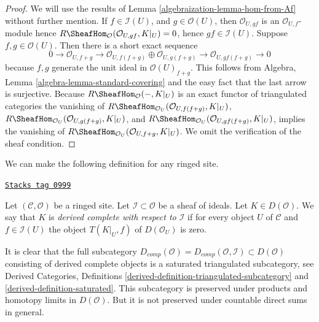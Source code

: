 \begin{proof}

We will use the results of Lemma \ref{algebraization-lemma-hom-from-Af} without further
mention. If $f \in \mathcal{I}(U)$, and $g \in \mathcal{O}(U)$, then
$\mathcal{O}_{U, gf}$ is an $\mathcal{O}_{U, f}$-module
hence $R\SheafHom_\mathcal{O}(\mathcal{O}_{U, gf}, K|_U) = 0$, hence
$gf \in \mathcal{I}(U)$. Suppose $f, g \in \mathcal{O}(U)$.
Then there is a short exact sequence
$$
0 \to \mathcal{O}_{U, f + g} \to
\mathcal{O}_{U, f(f + g)} \oplus \mathcal{O}_{U, g(f + g)} \to
\mathcal{O}_{U, gf(f + g)} \to 0
$$
because $f, g$ generate the unit ideal in $\mathcal{O}(U)_{f + g}$.
This follows from
Algebra, Lemma \ref{algebra-lemma-standard-covering}
and the easy fact that the last arrow is surjective.
Because $R\SheafHom_\mathcal{O}( - , K|_U)$ is an exact functor
of triangulated categories the vanishing of
$R\SheafHom_{\mathcal{O}_U}(\mathcal{O}_{U, f(f + g)}, K|_U)$,
$R\SheafHom_{\mathcal{O}_U}(\mathcal{O}_{U, g(f + g)}, K|_U)$, and
$R\SheafHom_{\mathcal{O}_U}(\mathcal{O}_{U, gf(f + g)}, K|_U)$,
implies the vanishing of
$R\SheafHom_{\mathcal{O}_U}(\mathcal{O}_{U, f + g}, K|_U)$.
We omit the verification of the sheaf condition.
\end{proof}

We can make the following definition for any ringed site.

\begin{definition}
\label{algebraization-definition-derived-complete}
\href{https://stacks.math.columbia.edu/tag/0999}{\texttt{Stacks tag 0999}}

Let $(\mathcal{C}, \mathcal{O})$ be a ringed site.
Let $\mathcal{I} \subset \mathcal{O}$ be a sheaf of ideals.
Let $K \in D(\mathcal{O})$. We say that $K$ is
{\it derived complete with respect to $\mathcal{I}$}
if for every object $U$ of $\mathcal{C}$ and $f \in \mathcal{I}(U)$
the object $T(K|_U, f)$ of $D(\mathcal{O}_U)$ is zero.
\end{definition}

It is clear that the full subcategory
$D_{comp}(\mathcal{O}) = D_{comp}(\mathcal{O}, \mathcal{I}) \subset
D(\mathcal{O})$ consisting of derived complete objects
is a saturated triangulated subcategory, see
Derived Categories, Definitions
\ref{derived-definition-triangulated-subcategory} and
\ref{derived-definition-saturated}. This subcategory is preserved
under products and homotopy limits in $D(\mathcal{O})$.
But it is not preserved under countable direct sums in general.

